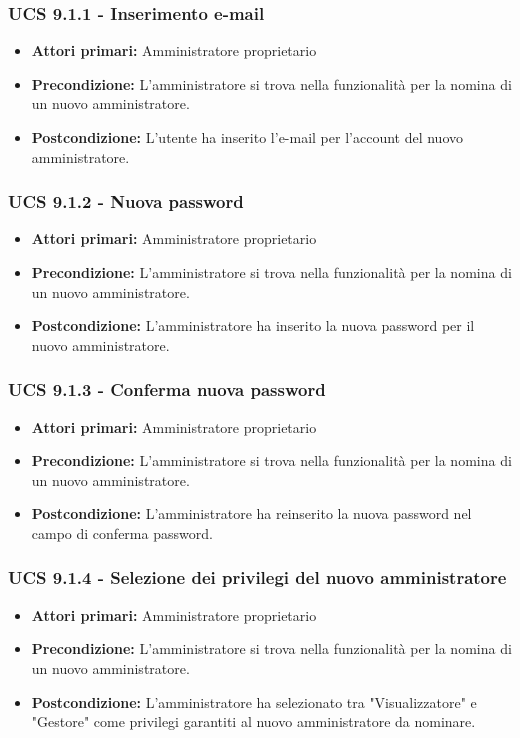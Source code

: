\subsubsection{UCS 9.1.1 - Inserimento e-mail}
\begin{itemize}
\item \textbf{Attori primari:} Amministratore proprietario
\item \textbf{Precondizione:} L'amministratore si trova nella funzionalità per la nomina di un nuovo amministratore.
\item \textbf{Postcondizione:} L'utente ha inserito l'e-mail per l'account del nuovo amministratore.
\end{itemize}

\subsubsection{UCS 9.1.2 - Nuova password}
\begin{itemize}
\item \textbf{Attori primari:} Amministratore proprietario
\item \textbf{Precondizione:}  L'amministratore si trova nella funzionalità per la nomina di un nuovo amministratore.
\item \textbf{Postcondizione:} L'amministratore ha inserito la nuova password per il nuovo amministratore.
\end{itemize}

\subsubsection{UCS 9.1.3 - Conferma nuova password}
\begin{itemize}
\item \textbf{Attori primari:} Amministratore proprietario
\item \textbf{Precondizione:} L'amministratore si trova nella funzionalità per la nomina di un nuovo amministratore.
\item \textbf{Postcondizione:} L'amministratore ha reinserito la nuova password nel campo di conferma password.
\end{itemize}

\subsubsection{UCS 9.1.4 - Selezione dei privilegi del nuovo amministratore}
\begin{itemize}
\item \textbf{Attori primari:} Amministratore proprietario
\item \textbf{Precondizione:} L'amministratore si trova nella funzionalità per la nomina di un nuovo amministratore.
\item \textbf{Postcondizione:} L'amministratore ha selezionato tra "Visualizzatore" e "Gestore" come privilegi garantiti al nuovo amministratore da nominare.
\end{itemize}

